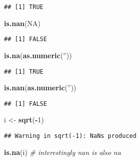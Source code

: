 \documentclass[
]{book}
\newenvironment{Shaded}{\begin{snugshade}}{\end{snugshade}}
\newcommand{\CommentTok}[1]{\textcolor[rgb]{0.56,0.35,0.01}{\textit{#1}}}
\newcommand{\DecValTok}[1]{\textcolor[rgb]{0.00,0.00,0.81}{#1}}
\newcommand{\KeywordTok}[1]{\textcolor[rgb]{0.13,0.29,0.53}{\textbf{#1}}}
\newcommand{\NormalTok}[1]{#1}
\newcommand{\OperatorTok}[1]{\textcolor[rgb]{0.81,0.36,0.00}{\textbf{#1}}}
\newcommand{\OtherTok}[1]{\textcolor[rgb]{0.56,0.35,0.01}{#1}}
\newcommand{\StringTok}[1]{\textcolor[rgb]{0.31,0.60,0.02}{#1}}
\begin{document}
\begin{verbatim}
## [1] TRUE
\end{verbatim}

\begin{Shaded}
\begin{Highlighting}[]
\KeywordTok{is.nan}\NormalTok{(}\OtherTok{NA}\NormalTok{)}
\end{Highlighting}
\end{Shaded}

\begin{verbatim}
## [1] FALSE
\end{verbatim}

\begin{Shaded}
\begin{Highlighting}[]
\KeywordTok{is.na}\NormalTok{(}\KeywordTok{as.numeric}\NormalTok{(}\StringTok{''}\NormalTok{))}
\end{Highlighting}
\end{Shaded}

\begin{verbatim}
## [1] TRUE
\end{verbatim}

\begin{Shaded}
\begin{Highlighting}[]
\KeywordTok{is.nan}\NormalTok{(}\KeywordTok{as.numeric}\NormalTok{(}\StringTok{''}\NormalTok{))}
\end{Highlighting}
\end{Shaded}

\begin{verbatim}
## [1] FALSE
\end{verbatim}

\begin{Shaded}
\begin{Highlighting}[]
\NormalTok{i <-}\StringTok{ }\KeywordTok{sqrt}\NormalTok{(}\OperatorTok{-}\DecValTok{1}\NormalTok{)}
\end{Highlighting}
\end{Shaded}

\begin{verbatim}
## Warning in sqrt(-1): NaNs produced
\end{verbatim}

\begin{Shaded}
\begin{Highlighting}[]
\KeywordTok{is.na}\NormalTok{(i) }\CommentTok{# interestingly nan is also na}
\end{Highlighting}
\end{Shaded}
\end{document}
